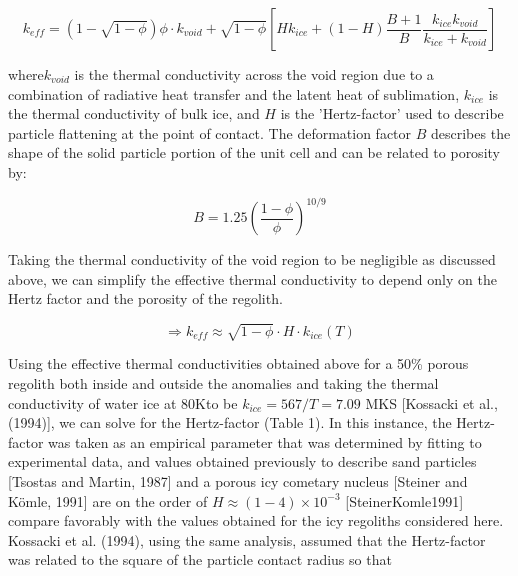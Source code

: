 \documentclass[11pt]{article} %
\begin{document}
	\begin{equation}
	k_{eff} = \left(1-\sqrt{1-\phi} \right)\phi \cdot k_{void} + \sqrt{1-\phi}\left[ H k_{ice}+(1 - H)\frac{B+1}{B}\frac{k_{ice}k_{void}}{k_{ice}+k_{void}} \right]
	\end{equation}
	
	where$k_{void}$ is the thermal conductivity across the void region due to a combination of radiative heat transfer and the latent heat of sublimation, $k_{ice}$ is the thermal conductivity of bulk ice, and $H$ is the 'Hertz-factor' used to describe particle flattening at the point of contact. The deformation factor $B$ describes the shape of the solid particle portion of the unit cell and can be related to porosity by:
	
	\begin{equation}
	B = 1.25 ( \frac{1-\phi}{\phi} )^{10/9}
	\end{equation}
	

	Taking the thermal conductivity of the void region to be negligible as discussed above, we can simplify the effective thermal conductivity to depend only on the Hertz factor and the porosity of the regolith.
	
	\begin{equation}\label{eq:unitcell}
	\Rightarrow k_{eff} \approx \sqrt{1-\phi}\cdot H \cdot k_{ice}(T)
	\end{equation}
	
	 Using the effective thermal conductivities obtained above for a 50\% porous regolith both inside and outside the anomalies and taking the thermal conductivity of water ice at 80Kto be $k_{ice} = 567/T = 7.09$ MKS [Kossacki et al., (1994)], we can solve for the Hertz-factor (Table 1). In this instance, the Hertz-factor was taken as an empirical parameter that was determined by fitting to experimental data, and values obtained previously to describe sand particles [Tsostas and Martin, 1987] and a porous icy cometary nucleus [Steiner and K\"{o}mle, 1991] are on the order of  $H  \approx (1 - 4) \times10^{-3}$ [SteinerKomle1991] compare favorably with the values obtained for the icy regoliths considered here. Kossacki et al. (1994), using the same analysis, assumed that the Hertz-factor was related to the square of the particle contact radius so that
	
\end{document}
